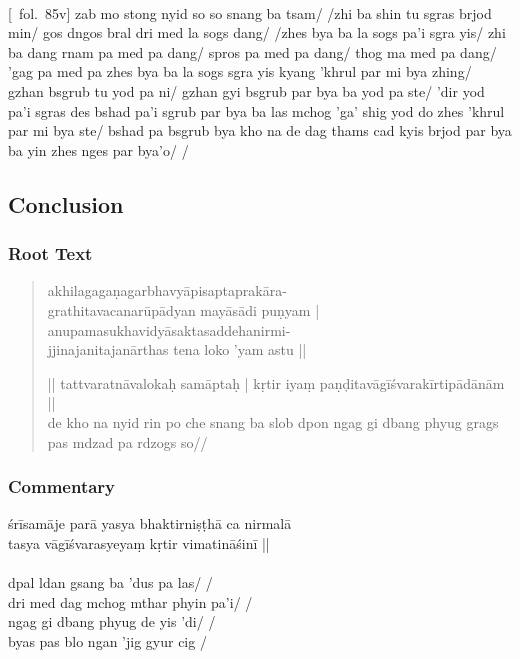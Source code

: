 \documentclass[12pt]{article}
\begin{document}
\textbf{\TVB}\\
{[}\TVB\ fol.\ 85v{]} zab mo stong nyid so so snang ba tsam/ /zhi ba shin tu sgras brjod min/ gos dngos bral dri med la sogs dang/ /zhes bya ba la sogs pa'i sgra yis/ zhi ba dang rnam pa med pa dang/ spros pa med pa dang/ thog ma med pa dang/ 'gag pa med pa zhes bya ba la sogs sgra yis kyang 'khrul par mi bya zhing/ gzhan bsgrub tu yod pa ni/ gzhan gyi bsgrub par bya ba yod pa ste/ 'dir yod pa'i sgras des bshad pa'i sgrub par bya ba las mchog 'ga' shig yod do zhes 'khrul par mi bya ste/ bshad pa bsgrub bya kho na de dag thams cad kyis brjod par bya ba yin zhes nges par bya'o/ /\\

\subsection{Conclusion}
\subsubsection{Root Text}
\begin{quote}
	akhilagagaṇagarbhavyāpisaptaprakāra\footnoteB{
		°saptaprakāra°] \EDD ; °sarvaprakāra° \MS
	}-\\
	grathitavacanarūpādyan mayāsādi puṇyam |\\
	anupamasukhavidyāsaktasaddehanirmi-\\
	jjinajanitajanārthas tena loko 'yam astu ||

	|| tattvaratnāvalokaḥ samāptaḥ | kṛtir iyaṃ paṇḍitavāgīśvarakīrtipādānām ||\\

	de kho na nyid rin po che snang ba slob dpon ngag gi dbang phyug grags pas mdzad pa rdzogs so// 
\end{quote}

\subsubsection{Commentary}
śrīsamāje parā yasya bhaktirniṣṭhā ca nirmalā\\
tasya vāgīśvarasyeyaṃ kṛtir vimatināśinī ||\\

\textbf{\TVA}\\
dpal ldan gsang ba 'dus pa las/ /\\
dri med dag mchog mthar phyin pa'i/ /\\
ngag gi dbang phyug de yis 'di/ /\\
byas pas blo ngan 'jig gyur cig /\\
\end{document}
